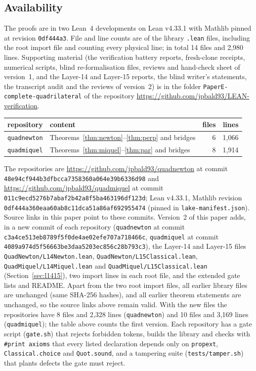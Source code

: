 \documentclass[11pt]{article}
\theoremstyle{definition}
\theoremstyle{remark}
\newcommand{\lean}[1]{\texttt{#1}}
\begin{document}
\subsection{Availability}\label{sec:avail}
The proofs are in two Lean~4 developments on Lean v4.33.1 with Mathlib pinned at revision
\texttt{0df444a3}. File and line counts are of the library \lean{.lean} files, including the root
import file and counting every physical line; in total 14 files and 2{,}980 lines.
Supporting material (the verification battery reports, fresh-clone receipts, numerical scripts, blind re-formalisation files, reviews and hand-check sheet of version~1, and the Layer-14 and Layer-15 reports, the blind writer's statements, the transcript audit and the reviews of version~2) is in the folder \texttt{PaperE-complete-quadrilateral} of the repository \url{https://github.com/jpbald93/LEAN-verification}.
\begin{center}\small
\begin{tabular}{llrr}
\toprule
repository & content & files & lines\\
\midrule
\lean{quadnewton} & Theorems~\ref{thm:newton}--\ref{thm:perp} and bridges & 6 & 1{,}066\\
\lean{quadmiquel} & Theorems~\ref{thm:miquel}--\ref{thm:par} and bridges & 8 & 1{,}914\\
\bottomrule
\end{tabular}
\end{center}
The repositories are \url{https://github.com/jpbald93/quadnewton} at commit
\texttt{48e94cf944b3dfbcca7358360a064e39b6336d98} and \url{https://github.com/jpbald93/quadmiquel} at commit
\texttt{011c9ecd5276b7abaf2b42a8f5ba463196df123d}; Lean v4.33.1, Mathlib revision \texttt{0df444a360eaa60ab8c11dca51a86af692955474}
(pinned in \lean{lake-manifest.json}). Source links in this paper point to these commits.
Version~2 of this paper adds, in a new commit of each repository (\lean{quadnewton} at commit
\texttt{c3a4ce513eb8789f5f0de4ae02efe707a718466c}, \lean{quadmiquel} at commit \texttt{4089a974d5f56663be3daa5203ec856c28b793c3}), the Layer-14 and Layer-15 files
\lean{QuadNewton/L14Newton.lean}, \lean{QuadNewton/L15Classical.lean},
\lean{QuadMiquel/L14Miquel.lean} and \lean{QuadMiquel/L15Classical.lean} (Section~\ref{sec:l1415}),
two import lines in each root file, and the extended gate lists and README. Apart from the two root
import files, all earlier library files are unchanged (same SHA-256 hashes), and all earlier theorem
statements are unchanged, so the source links above remain valid. With
the new files the repositories have 8 files and 2{,}328 lines (\lean{quadnewton}) and 10 files and
3{,}169 lines (\lean{quadmiquel}); the table above counts the first version.
Each repository has a gate script (\lean{gate.sh}) that rejects forbidden tokens, builds the library
and checks with \lean{\#print axioms} that every listed declaration depends only on
\lean{propext}, \lean{Classical.choice} and \lean{Quot.sound}, and a tampering suite
(\lean{tests/tamper.sh}) that plants defects the gate must reject.
\end{document}
